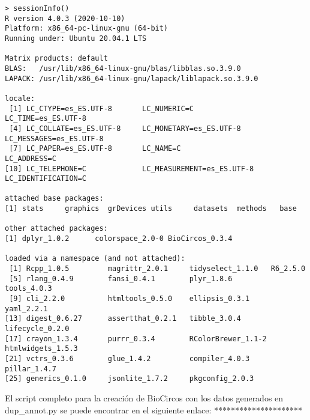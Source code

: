 \begin{verbatim}
> sessionInfo()
R version 4.0.3 (2020-10-10)
Platform: x86_64-pc-linux-gnu (64-bit)
Running under: Ubuntu 20.04.1 LTS

Matrix products: default
BLAS:   /usr/lib/x86_64-linux-gnu/blas/libblas.so.3.9.0
LAPACK: /usr/lib/x86_64-linux-gnu/lapack/liblapack.so.3.9.0

locale:
 [1] LC_CTYPE=es_ES.UTF-8       LC_NUMERIC=C               LC_TIME=es_ES.UTF-8       
 [4] LC_COLLATE=es_ES.UTF-8     LC_MONETARY=es_ES.UTF-8    LC_MESSAGES=es_ES.UTF-8   
 [7] LC_PAPER=es_ES.UTF-8       LC_NAME=C                  LC_ADDRESS=C              
[10] LC_TELEPHONE=C             LC_MEASUREMENT=es_ES.UTF-8 LC_IDENTIFICATION=C       

attached base packages:
[1] stats     graphics  grDevices utils     datasets  methods   base     

other attached packages:
[1] dplyr_1.0.2      colorspace_2.0-0 BioCircos_0.3.4 

loaded via a namespace (and not attached):
 [1] Rcpp_1.0.5         magrittr_2.0.1     tidyselect_1.1.0   R6_2.5.0          
 [5] rlang_0.4.9        fansi_0.4.1        plyr_1.8.6         tools_4.0.3       
 [9] cli_2.2.0          htmltools_0.5.0    ellipsis_0.3.1     yaml_2.2.1        
[13] digest_0.6.27      assertthat_0.2.1   tibble_3.0.4       lifecycle_0.2.0   
[17] crayon_1.3.4       purrr_0.3.4        RColorBrewer_1.1-2 htmlwidgets_1.5.3 
[21] vctrs_0.3.6        glue_1.4.2         compiler_4.0.3     pillar_1.4.7      
[25] generics_0.1.0     jsonlite_1.7.2     pkgconfig_2.0.3 \end{verbatim}


El script completo para la creación de BioCircos con los datos generados en dup\_annot.py se puede encontrar en el siguiente enlace: *********************